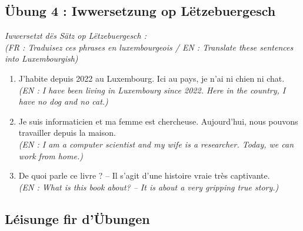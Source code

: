 \subsection*{Übung 4 : Iwwersetzung op Lëtzebuergesch}
\textit{Iwwersetzt dës Sätz op Lëtzebuergesch :} \\
\textit{\small(FR : Traduisez ces phrases en luxembourgeois / EN : Translate these sentences into Luxembourgish)}

\begin{enumerate}
    \item J'habite depuis 2022 au Luxembourg. Ici au pays, je n'ai ni chien ni chat. \\
    \small\textit{(EN : I have been living in Luxembourg since 2022. Here in the country, I have no dog and no cat.)}
    \item Je suis informaticien et ma femme est chercheuse. Aujourd'hui, nous pouvons travailler depuis la maison. \\
    \small\textit{(EN : I am a computer scientist and my wife is a researcher. Today, we can work from home.)}
    \item De quoi parle ce livre ? -- Il s'agit d'une histoire vraie très captivante. \\
    \small\textit{(EN : What is this book about? -- It is about a very gripping true story.)}
\end{enumerate}

\vspace{1em}

\subsection*{Léisunge fir d'Übungen}

